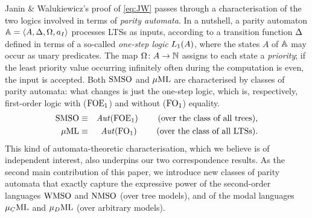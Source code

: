 Janin \& Walukiewicz's proof of \eqref{eq:JW} passes through a characterisation 
of the two logics involved in terms of \emph{parity automata}.
In a nutshell, a parity automaton $\mathbb{A} = \langle{A,\Delta,\Omega,a_I}\rangle$ processes
LTSs as inputs, according to a transition function $\Delta$ defined in terms of
a so-called \emph{one-step logic} $L_{1}(A)$, where the states $A$ of 
$\mathbb{A}$ may occur as unary predicates. 
The map $\Omega \colon A \to \mathbb{N}$ assigns to each state a \emph{priority};
if the least priority value occurring infinitely often during the computation is 
even, the input is accepted.
Both $\mathrm{SMSO}$ and $\mu\mathrm{ML}$ are characterised by classes of parity automata: what 
changes is just the one-step logic, which is, respectively, first-order logic 
with ($\mathrm{FOE}_1$) and without ($\mathrm{FO}_1$) equality. 
\begin{eqnarray}
\smso & \equiv & \Aut(\ofoe)
 \qquad \text{ (over the class of all trees)}, \label{eq:AutCharMSO}
\\ \muML & \equiv & \Aut(\ofo)
  \qquad \text{ (over the class of all LTSs)}. \label{eq:AutCharMuML}
\end{eqnarray}
This kind of automata-theoretic characterisation, which we believe is of independent interest, also underpins our two correspondence results. As the second main contribution of this paper, we
introduce new classes of parity automata that exactly capture the expressive
power of the second-order languages $\mathrm{WMSO}$ and $\mathrm{NMSO}$ (over tree models), 
and of the modal languages $\mu_{C}\mathrm{ML}$ and $\mu_{D}\mathrm{ML}$ (over arbitrary models).

